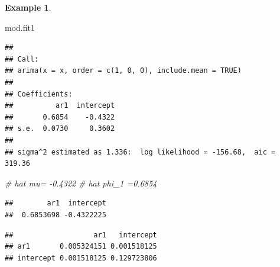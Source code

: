 \documentclass[
]{book}
\newenvironment{Shaded}{\begin{snugshade}}{\end{snugshade}}
\newcommand{\AttributeTok}[1]{\textcolor[rgb]{0.77,0.63,0.00}{#1}}
\newcommand{\CommentTok}[1]{\textcolor[rgb]{0.56,0.35,0.01}{\textit{#1}}}
\newcommand{\DecValTok}[1]{\textcolor[rgb]{0.00,0.00,0.81}{#1}}
\newcommand{\FunctionTok}[1]{\textcolor[rgb]{0.00,0.00,0.00}{#1}}
\newcommand{\NormalTok}[1]{#1}
\newcommand{\OtherTok}[1]{\textcolor[rgb]{0.56,0.35,0.01}{#1}}
\newcommand{\SpecialCharTok}[1]{\textcolor[rgb]{0.00,0.00,0.00}{#1}}
\theoremstyle{definition}
\theoremstyle{definition}
\newtheorem{example}{Example}[chapter]
\theoremstyle{definition}
\theoremstyle{definition}
\theoremstyle{remark}
\begin{document}
\begin{example}
\begin{Shaded}
\begin{Highlighting}[]
\NormalTok{mod.fit1}
\end{Highlighting}
\end{Shaded}

\begin{verbatim}
## 
## Call:
## arima(x = x, order = c(1, 0, 0), include.mean = TRUE)
## 
## Coefficients:
##          ar1  intercept
##       0.6854    -0.4322
## s.e.  0.0730     0.3602
## 
## sigma^2 estimated as 1.336:  log likelihood = -156.68,  aic = 319.36
\end{verbatim}

\begin{Shaded}
\begin{Highlighting}[]
\CommentTok{\# hat mu= {-}0.4322}
\CommentTok{\# hat phi\_1 =0.6854}
\end{Highlighting}
\end{Shaded}

\begin{Shaded}
\end{Shaded}

\begin{verbatim}
##        ar1  intercept 
##  0.6853698 -0.4322225
\end{verbatim}

\begin{Shaded}
\end{Shaded}

\begin{verbatim}
##                   ar1   intercept
## ar1       0.005324151 0.001518125
## intercept 0.001518125 0.129723806
\end{verbatim}

\begin{Shaded}
\end{Shaded}


\end{example}
\end{document}
